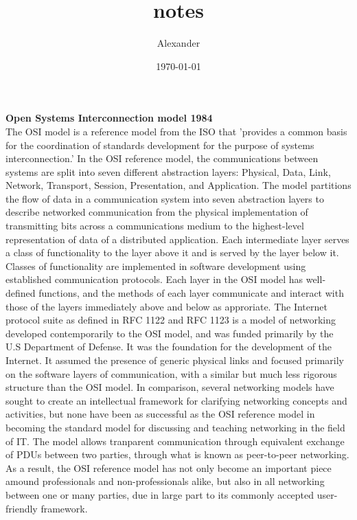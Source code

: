 \documentclass{article}
\title{notes}
\author{Alexander}
\date{\today}
\begin{document}
\maketitle

\textbf{Open Systems Interconnection model 1984}\\

	The OSI model is a reference model from the ISO that 'provides a common basis for the coordination of standards development for the purpose of systems interconnection.' In the OSI reference model, the communications between systems are split into seven different abstraction layers: Physical, Data, Link, Network, Transport, Session, Presentation, and Application. The model partitions the flow of data in a communication system into seven abstraction layers to describe networked communication from the physical implementation of transmitting bits across a communications medium to the highest-level representation of data of a distributed application. Each intermediate layer serves a class of functionality to the layer above it and is served by the layer below it. Classes of functionality are implemented in software development using established communication protocols. Each layer in the OSI model has well-defined functions, and the methods of each layer communicate and interact with those of the layers immediately above and below as approriate. The Internet protocol suite as defined in RFC 1122 and RFC 1123 is a model of networking developed contemporarily to the OSI model, and was funded primarily by the U.S Department of Defense. It was the foundation for the development of the Internet. It assumed the presence of generic physical links and focused primarily on the software layers of communication, with a similar but much less rigorous structure than the OSI model. In comparison, several networking models have sought to create an intellectual framework for clarifying networking concepts and activities, but none have been as successful as the OSI reference model in becoming the standard model for discussing and teaching networking in the field of IT. The model allows tranparent communication through equivalent exchange of PDUs between two parties, through what is known as peer-to-peer networking. As a result, the OSI reference model has not only become an important piece amound professionals and non-professionals alike, but also in all networking between one or many parties, due in large part to its commonly accepted user-friendly framework.\\
\end{document}
